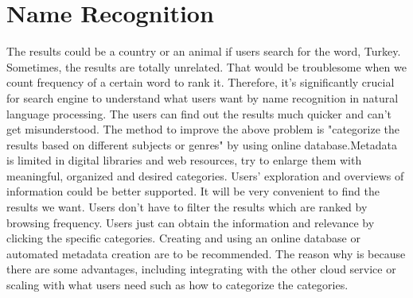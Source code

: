 \section*{Name Recognition}
The results could be a country or an animal if users search for the word, Turkey. Sometimes, the results are totally unrelated. That would be troublesome when we count frequency of a certain word to rank it. 
Therefore, it's significantly crucial for search engine to understand what users want by name recognition in natural language processing. The users can find out the results much quicker and can't get misunderstood.
The method to improve the above problem is "categorize the results based on different subjects or genres" by using online database.Metadata is limited in digital libraries and web resources, try to enlarge them with meaningful, organized and desired categories.\cite{Bill2006, Categorizing Web Search Results into Meaningful and Stable Categories Using Fast-Feature Techniques}
Users' exploration and overviews of information could be better supported. It will be very convenient to find the results we want.\cite{Jin2008, Effectiveness Web Search Results for Genre and Sentiment Classification} Users don't have to filter the results which are ranked by browsing frequency. Users just can obtain the information and relevance by clicking the specific categories. 
Creating and using an online database or automated metadata creation are to be recommended. The reason why is because there are some advantages, including integrating with the other cloud service or scaling with what users need such as how to categorize the categories.\\


